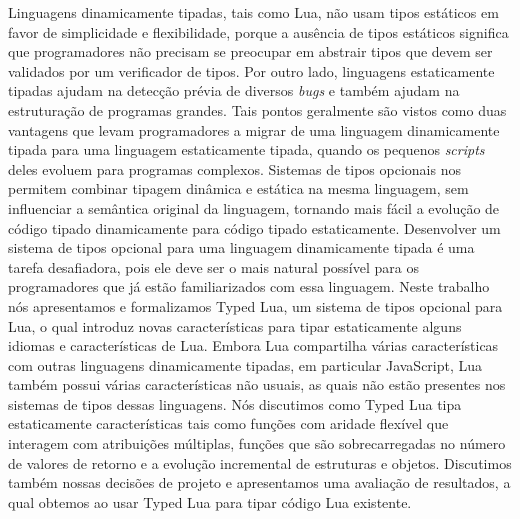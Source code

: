 Linguagens dinamicamente tipadas, tais como Lua, não usam tipos estáticos em
favor de simplicidade e flexibilidade, porque a ausência de tipos estáticos
significa que programadores não precisam se preocupar em abstrair tipos que
devem ser validados por um verificador de tipos.
Por outro lado, linguagens estaticamente tipadas ajudam na detecção prévia de
diversos \emph{bugs} e também ajudam na estruturação de programas grandes.
Tais pontos geralmente são vistos como duas vantagens que levam programadores
a migrar de uma linguagem dinamicamente tipada para uma linguagem estaticamente tipada,
quando os pequenos \emph{scripts} deles evoluem para programas complexos.
Sistemas de tipos opcionais nos permitem combinar tipagem dinâmica e estática na
mesma linguagem, sem influenciar a semântica original da linguagem, tornando mais
fácil a evolução de código tipado dinamicamente para código tipado estaticamente.
Desenvolver um sistema de tipos opcional para uma linguagem dinamicamente tipada é
uma tarefa desafiadora, pois ele deve ser o mais natural possível para os programadores
que já estão familiarizados com essa linguagem.
Neste trabalho nós apresentamos e formalizamos Typed Lua, um sistema de tipos opcional
para Lua, o qual introduz novas características para tipar estaticamente alguns idiomas
e características de Lua.
Embora Lua compartilha várias características com outras linguagens dinamicamente
tipadas, em particular JavaScript, Lua também possui várias características não usuais,
as quais não estão presentes nos sistemas de tipos dessas linguagens.
Nós discutimos como Typed Lua tipa estaticamente características tais como
funções com aridade flexível que interagem com atribuições múltiplas,
funções que são sobrecarregadas no número de valores de retorno e a evolução
incremental de estruturas e objetos.
Discutimos também nossas decisões de projeto e apresentamos uma avaliação de
resultados, a qual obtemos ao usar Typed Lua para tipar código Lua existente.
